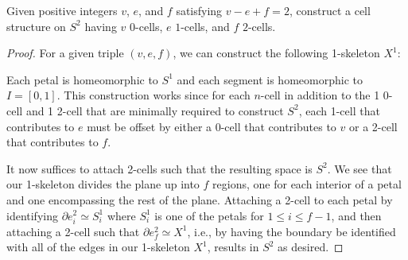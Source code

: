 \documentclass[12pt]{article}
\theoremstyle{remark}
\begin{document}
\setcounter{subsubsection}{13}
\begin{problem}
  Given positive integers $v$, $e$, and $f$ satisfying $v - e + f = 2$, construct a cell structure on $S^2$ having $v$ $0$-cells, $e$ $1$-cells, and $f$ $2$-cells.
\end{problem}
\begin{proof}
  For a given triple $(v,e,f)$, we can construct the following 1-skeleton $X^1$:
  \begin{center}
  \end{center}
  Each petal is homeomorphic to $S^1$ and each segment is homeomorphic to $I = [0,1]$. This construction works since for each $n$-cell in addition to the 1 0-cell and 1 2-cell that are minimally required to construct $S^2$, each 1-cell that contributes to $e$ must be offset by either a 0-cell that contributes to $v$ or a 2-cell that contributes to $f$.
  \par It now suffices to attach 2-cells such that the resulting space is $S^2$. We see that our 1-skeleton divides the plane up into $f$ regions, one for each interior of a petal and one encompassing the rest of the plane. Attaching a 2-cell to each petal by identifying $\partial e_i^2 \simeq S^1_i$ where $S^1_i$ is one of the petals for $1 \le i \le f-1$, and then attaching a 2-cell such that $\partial e_f^2 \simeq X^1$, i.e., by having the boundary be identified with all of the edges in our 1-skeleton $X^1$, results in $S^2$ as desired.
\end{proof}
\end{document}
